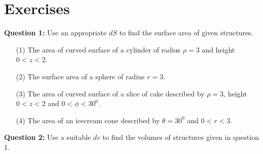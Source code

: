 \documentclass[12pt,a4paper]{article}
\begin{document}
\section{Exercises}
\noindent\textbf{Question 1:} Use an appropriate $dS$ to find the surface area of given structures.
\begin{itemize}
\item[(1)] The area of curved surface of a cylinder of radius $\rho=3$ and height $0<z<2$.
\item[(2)] The surface area of a sphere of radius $r=3$.
\item[(3)] The area of curved surface of a slice of cake described by $\rho=3$, height $0<z<2$ and $0<\phi<30^0$.
\item[(4)] The area of an icecream cone described by $\theta=30^0$ and $0<r<3$.
\end{itemize}
\noindent\textbf{Question 2:} Use a suitable $dv$ to find the volumes of structures given in question 1.\\[0.2cm]
\end{document}
